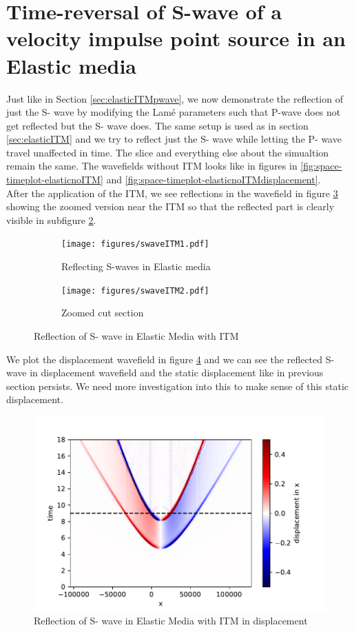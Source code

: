 \section{Time-reversal of S-wave of a velocity impulse point source in an Elastic media}
Just like in Section \ref{sec:elasticITMpwave}, we now demonstrate the reflection of just the S- wave by modifying the Lam\'{e} parameters such that P-wave does not
get reflected but the S- wave does. The same setup is used as in section \ref{sec:elasticITM} and we try to reflect just the S- wave while letting the P- wave travel
unaffected in time. The slice and everything else about the simualtion remain the same. The wavefields without \ac{ITM} looks like in figures in \ref{fig:space-timeplot-elasticnoITM}
and \ref{fig:space-timeplot-elasticnoITMdisplacement}. \\

After the application of the \ac{ITM}, we see reflections in the wavefield in figure \ref{fig:space-timeplot-swave} showing the zoomed version near the 
\ac{ITM} so that the reflected part is clearly visible in subfigure \ref{subfig:swavezoomed}.

\begin{figure}
    \begin{subfigure}[b]{0.49\textwidth}   
        \centering 
        \texttt{[image: figures/swaveITM1.pdf]}
        \caption{Reflecting S-waves in Elastic media}
        \label{subfig:swave}
    \end{subfigure}
    \hfill
    \begin{subfigure}[b]{0.49\textwidth}   
        \centering 
        \texttt{[image: figures/swaveITM2.pdf]}
        \caption{Zoomed cut section}
        \label{subfig:swavezoomed}
    \end{subfigure}
    \caption{Reflection of S- wave in Elastic Media with \ac{ITM}}
    \label{fig:space-timeplot-swave}
\end{figure}
    
We plot the displacement wavefield in figure \ref{fig:space-timeplot-swavedisplacement} and we can see the reflected S- wave in displacement 
wavefield and the static displacement like in previous section persists. We need more investigation into this to make sense of this static displacement.

\begin{figure}
    \centering
    \includegraphics[width=0.75\linewidth]{figures/swaveITMdisplacement.pdf}
    \caption{Reflection of S- wave in Elastic Media with \ac{ITM} in displacement}
    \label{fig:space-timeplot-swavedisplacement}
\end{figure}

